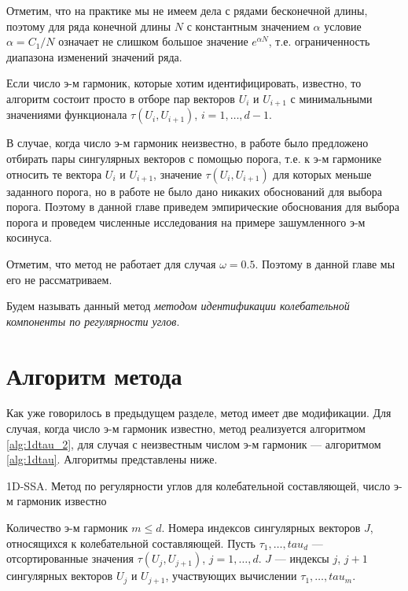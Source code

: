 \documentclass[specialist,
               substylefile = spbu.rtx,
               subf,href,colorlinks=true, 12pt]{disser}
\begin{document}
Отметим, что на практике мы не имеем дела с рядами бесконечной длины, поэтому для ряда конечной длины $N$ с константным значением $\alpha$ условие $\alpha = C_1/N$ означает не слишком большое значение $e^{\alpha N}$, т.е. ограниченность диапазона изменений значений ряда.   


Если число э-м гармоник, которые хотим идентифицировать, известно, то алгоритм состоит просто в отборе пар векторов $U_i$ и $U_{i+1}$ с минимальными значениями функционала  $\tau(U_i, U_{i+1})$, $i=1,\ldots, d-1$.

В случае, когда число
э-м гармоник неизвестно, в работе \cite{Zhornikova2016} было предложено отбирать пары сингулярных векторов с
помощью порога, т.е. к э-м гармонике относить те вектора $U_i$ и $U_{i+1}$, значение  $\tau(U_i, U_{i+1})$ для которых меньше заданного порога, но в работе не было дано никаких обоснований для выбора порога. 
Поэтому в данной главе приведем эмпирические обоснования для выбора порога и проведем численные исследования на примере зашумленного э-м косинуса.    

Отметим, что метод не работает для случая $\omega = 0.5$. Поэтому в данной главе мы его не рассматриваем. 

 Будем называть данный метод \textit{методом идентификации колебательной компоненты по регулярности углов}.


\section{Алгоритм метода}
Как уже говорилось в предыдущем разделе, метод имеет две модификации. Для случая, когда число э-м гармоник известно, метод реализуется алгоритмом \ref{alg:1dtau_2}, для случая с неизвестным числом э-м гармоник --- алгоритмом \ref{alg:1dtau}. Алгоритмы представлены ниже.

\begin{algorithm}[!hhh]
\caption{1D-SSA. Метод по регулярности углов для колебательной составляющей, число э-м гармоник известно}
\label{alg:1dtau_2}
\begin{algorithmic}[1]
\REQUIRE Количество э-м гармоник $m \leqslant d$.
\ENSURE Номера индексов сингулярных векторов $J$, относящихся к колебательной составляющей.
\STATE  Пусть $\tau_1, \ldots, tau_d$ --- отсортированные значения $\tau(U_j, U_{j+1})$, $j=1,\ldots, d$.
$J$ --- индексы $j$, $j+1$ сингулярных векторов $U_j$ и $U_{j+1}$, участвующих вычислении $\tau_1, \ldots, tau_m$. 
\end{algorithmic}
\end{algorithm}
\end{document}
